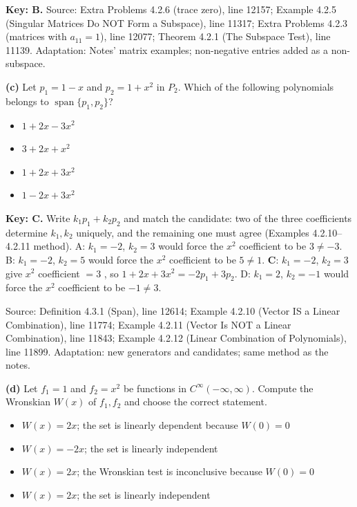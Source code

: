 \documentclass[11pt,a4paper]{article}
\newcommand{\Src}[1]{{\footnotesize\color{black!65}Source: #1}}
\begin{document}
\textbf{Key: B.} \Src{Extra Problems 4.2.6 (trace zero), line 12157; Example 4.2.5 (Singular Matrices Do NOT Form a Subspace), line 11317; Extra Problems 4.2.3 (matrices with $a_{11}=1$), line 12077; Theorem 4.2.1 (The Subspace Test), line 11139. Adaptation: Notes' matrix examples; non-negative entries added as a non-subspace.}\par
\textbf{(c)} Let $p_1=1-x$ and $p_2=1+x^{2}$ in $P_2$. Which of the following polynomials belongs to $\operatorname{span}\{p_1,p_2\}$?\par
\begin{itemize}[leftmargin=8mm,itemsep=0pt]\item[A] $1+2x-3x^{2}$\item[B] $3+2x+x^{2}$\item[C$^{\ast}$] $1+2x+3x^{2}$\item[D] $1-2x+3x^{2}$\end{itemize}
\textbf{Key: C.} Write $k_1p_1+k_2p_2$ and match the candidate: two of the three coefficients determine $k_1,k_2$ uniquely, and the remaining one must agree (Examples 4.2.10--4.2.11 method). A: $k_1=-2$, $k_2=3$ would force the $x^{2}$ coefficient to be $3\neq-3$. B: $k_1=-2$, $k_2=5$ would force the $x^{2}$ coefficient to be $5\neq1$. \textbf{C}: $k_1=-2$, $k_2=3$ give $x^{2}$ coefficient $=3$ \checkmark, so $1+2x+3x^{2}=-2p_1+3p_2$. D: $k_1=2$, $k_2=-1$ would force the $x^{2}$ coefficient to be $-1\neq3$.\par
\Src{Definition 4.3.1 (Span), line 12614; Example 4.2.10 (Vector IS a Linear Combination), line 11774; Example 4.2.11 (Vector Is NOT a Linear Combination), line 11843; Example 4.2.12 (Linear Combination of Polynomials), line 11899. Adaptation: new generators and candidates; same method as the notes.}\par
\textbf{(d)} Let $f_1=1$ and $f_2=x^{2}$ be functions in $C^{\infty}(-\infty,\infty)$. Compute the Wronskian $W(x)$ of $f_1,f_2$ and choose the correct statement.\par
\begin{itemize}[leftmargin=8mm,itemsep=0pt]\item[A] $W(x)=2x$; the set is linearly dependent because $W(0)=0$\item[B] $W(x)=-2x$; the set is linearly independent\item[C] $W(x)=2x$; the Wronskian test is inconclusive because $W(0)=0$\item[D$^{\ast}$] $W(x)=2x$; the set is linearly independent\end{itemize}
\end{document}
